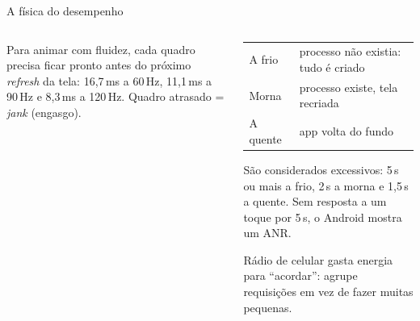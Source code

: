 \documentclass[aspectratio=169,10pt]{beamer}
\begin{document}
\begin{frame}{A física do desempenho}
  \begin{columns}[T]
    \begin{column}{0.5\textwidth}
      \begin{definicao}
        Para animar com fluidez, cada quadro precisa ficar pronto antes do próximo \emph{refresh} da tela: 16,7\,ms a 60\,Hz, 11,1\,ms a 90\,Hz e 8,3\,ms a 120\,Hz. Quadro atrasado = \emph{jank} (engasgo).
      \end{definicao}
      \centering
    \end{column}
    \begin{column}{0.48\textwidth}
      \scriptsize
      \begin{tabularx}{\linewidth}{@{}l L@{}}
        \toprule
         &  \\
        \midrule
        A frio & processo não existia: tudo é criado \\
        Morna & processo existe, tela recriada \\
        A quente & app volta do fundo \\
        \bottomrule
      \end{tabularx}
      \begin{atencao}
        São considerados excessivos: 5\,s ou mais a frio, 2\,s a morna e 1,5\,s a quente. Sem resposta a um toque por 5\,s, o Android mostra um ANR.
      \end{atencao}
      \begin{dica}
        Rádio de celular gasta energia para ``acordar'': agrupe requisições em vez de fazer muitas pequenas.
      \end{dica}
    \end{column}
  \end{columns}
\end{frame}
\end{document}
